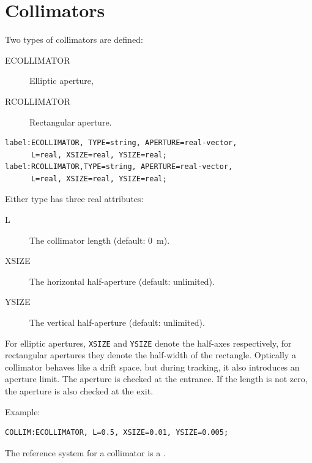 
\section{Collimators}
\label{sec:collimators}
Two types of collimators are defined:
\begin{description}
\item[ECOLLIMATOR]
  \label{sec:ecollimator}
  Elliptic aperture,
\item[RCOLLIMATOR]
  \label{sec:rcollimator}
  Rectangular aperture.
\end{description}
\begin{verbatim}
label:ECOLLIMATOR, TYPE=string, APERTURE=real-vector, 
      L=real, XSIZE=real, YSIZE=real;
label:RCOLLIMATOR,TYPE=string, APERTURE=real-vector, 
      L=real, XSIZE=real, YSIZE=real;
\end{verbatim}
Either type has three real attributes:
\begin{description}
\item[L]
  The collimator length (default: 0~m).
\item[XSIZE]
  The horizontal half-aperture (default: unlimited).
\item[YSIZE]
  The vertical half-aperture (default: unlimited).
\end{description}
For elliptic apertures,
\texttt{XSIZE} and \texttt{YSIZE} denote the half-axes respectively,
for rectangular apertures they denote the half-width of the rectangle.
Optically a collimator behaves like a drift space, but during tracking,
it also introduces an aperture limit.
The aperture is checked at the entrance.
If the length is not zero, the aperture is also checked at the exit.

\noindent Example:
\begin{verbatim}
COLLIM:ECOLLIMATOR, L=0.5, XSIZE=0.01, YSIZE=0.005;
\end{verbatim}
The reference system for a collimator is a 
.


